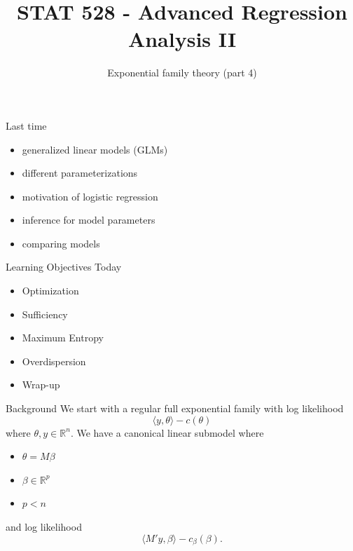 \documentclass[
  ignorenonframetext,
]{beamer}
\title{STAT 528 - Advanced Regression Analysis II}
\author{Exponential family theory (part 4)}
\date{}
\institute{Daniel J. Eck\\
Department of Statistics\\
University of Illinois}
\providecommand{\tightlist}{%
  \setlength{\itemsep}{0pt}\setlength{\parskip}{0pt}}
\begin{document}
\frame{\titlepage}

\begin{frame}
\newcommand{\R}{\mathbb{R}}
\newcommand{\Prob}{\mathbb{P}}
\newcommand{\Proj}{\textbf{P}}
\newcommand{\Hcal}{\mathcal{H}}
\newcommand{\rootn}{\sqrt{n}}
\newcommand{\p}{\mathbf{p}}
\newcommand{\E}{\text{E}}
\newcommand{\Var}{\text{Var}}
\newcommand{\Cov}{\text{Cov}}

\newtheorem{cor}{Corollary}
\newtheorem{lem}{Lemma}
\newtheorem{thm}{Theorem}
\newtheorem{defn}{Definition}
\newtheorem{prop}{Proposition}
\end{frame}

\begin{frame}{Last time}
\protect\hypertarget{last-time}{}
\begin{itemize}
\tightlist
\item
  generalized linear models (GLMs)
\item
  different parameterizations
\item
  motivation of logistic regression
\item
  inference for model parameters
\item
  comparing models
\end{itemize}
\end{frame}

\begin{frame}{Learning Objectives Today}
\protect\hypertarget{learning-objectives-today}{}
\begin{itemize}
\tightlist
\item
  Optimization
\item
  Sufficiency
\item
  Maximum Entropy
\item
  Overdispersion
\item
  Wrap-up
\end{itemize}
\end{frame}

\begin{frame}{Background}
\protect\hypertarget{background}{}
We start with a regular full exponential family with log likelihood \[
  \langle y,\theta \rangle - c(\theta)
\] where \(\theta,y \in \mathbb{R}^n\). We have a canonical linear
submodel where

\begin{itemize}
\tightlist
\item
  \(\theta = M\beta\)
\item
  \(\beta \in \mathbb{R}^p\)
\item
  \(p < n\)
\end{itemize}

and log likelihood \[
  \langle M'y, \beta \rangle - c_\beta(\beta).
\]
\end{frame}
\end{document}

